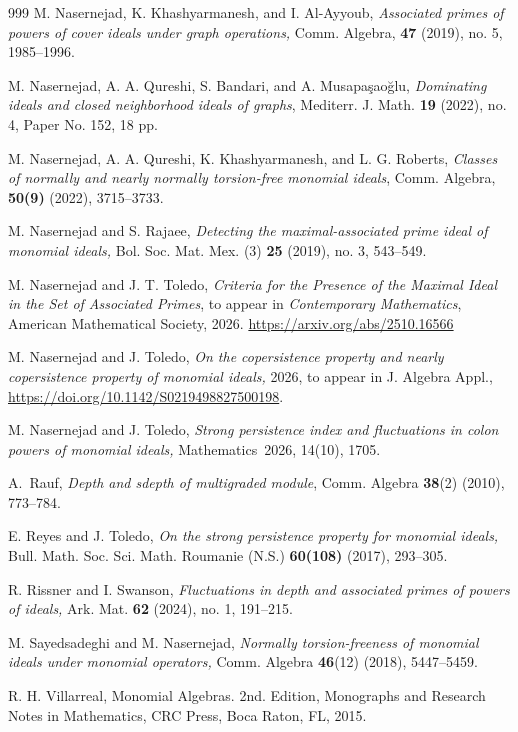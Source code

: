 \documentclass[11pt]{amsart}
\begin{document}
\begin{thebibliography}{999}
    M. Nasernejad,  K. Khashyarmanesh, and  I. Al-Ayyoub, {\it Associated primes of powers  of cover ideals under graph operations,} Comm. 
Algebra, {\bf 47} (2019), no. 5, 1985--1996. 


 M. Nasernejad, A. A. Qureshi, S. Bandari, and A.  Musapa\c{s}ao\u{g}lu, {\it  Dominating ideals and closed neighborhood ideals of graphs}, Mediterr. J. Math. {\bf 19}  (2022), no. 4, Paper No. 152, 18 pp. 

  M. Nasernejad, A. A. Qureshi, K. Khashyarmanesh, and L. G. Roberts,  {\it Classes of normally and nearly normally torsion-free monomial ideals}, Comm. Algebra, {\bf 50(9)} (2022), 3715--3733. 


 M. Nasernejad and S.  Rajaee, \textit{Detecting the maximal-associated prime ideal of monomial ideals,}
 Bol. Soc. Mat. Mex. (3) \textbf{25} (2019), no. 3, 543--549. 
 
 
 M. Nasernejad and J. T.  Toledo,
\textit{Criteria for the Presence of the Maximal Ideal in the Set of Associated Primes},
to appear in \textit{Contemporary Mathematics}, American Mathematical Society, 2026.  \url{https://arxiv.org/abs/2510.16566}

  M. Nasernejad     and   J. Toledo,  \textit{On the copersistence property and nearly copersistence property of monomial ideals,}
2026, to appear in J. Algebra Appl.,    \url{https://doi.org/10.1142/S0219498827500198}.


 
  M. Nasernejad     and   J. Toledo,  \textit{Strong persistence index and fluctuations in colon powers of monomial ideals,}
 Mathematics~2026, 14(10), 1705.  

 A.\ Rauf, \textit{Depth and sdepth of multigraded module}, Comm. Algebra
\textbf{38}(2) (2010), 773--784.


    E. Reyes  and J. Toledo, {\it On the strong persistence property for monomial ideals,}  Bull. Math. Soc. Sci. Math. Roumanie (N.S.) 
{\bf 60(108)} (2017),  293--305. 


 R. Rissner and I.  Swanson, \textit{Fluctuations in depth and associated primes of powers of ideals,}  Ark. Mat. \textbf{62} (2024), no. 1, 191--215. 


   M. Sayedsadeghi and M. Nasernejad, \textit{ Normally torsion-freeness of monomial ideals under monomial operators,}  Comm. Algebra {\bf 46}(12) (2018),  5447--5459.


  R. H. Villarreal, {Monomial Algebras.} 2nd. Edition, Monographs and Research Notes in Mathematics, CRC Press, Boca Raton, FL, 2015.
  \end{thebibliography}
  
  




\end{document}
